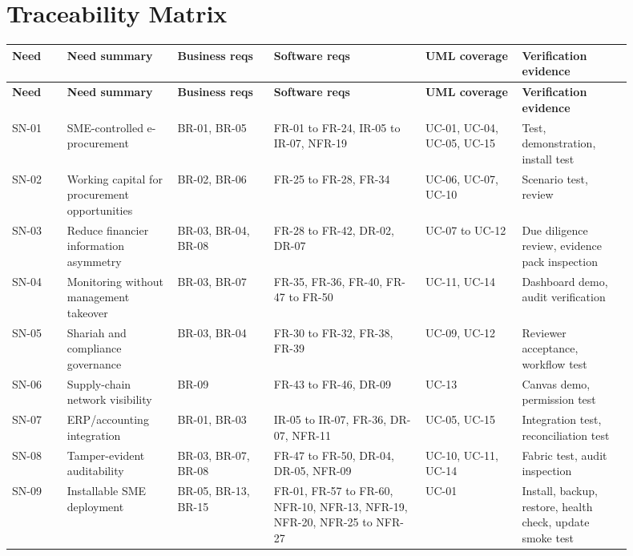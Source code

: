 \documentclass[11pt,a4paper]{article}
\begin{document}
\section{Traceability Matrix}
\begin{landscape}
\begin{footnotesize}
\begin{longtable}{@{}p{0.08\linewidth}p{0.16\linewidth}p{0.14\linewidth}p{0.22\linewidth}p{0.14\linewidth}p{0.16\linewidth}@{}}
\rowcolor{gray!18}\textbf{Need} & \textbf{Need summary} & \textbf{Business reqs} & \textbf{Software reqs} & \textbf{UML coverage} & \textbf{Verification evidence} \\ \hline
\endfirsthead
\rowcolor{gray!18}\textbf{Need} & \textbf{Need summary} & \textbf{Business reqs} & \textbf{Software reqs} & \textbf{UML coverage} & \textbf{Verification evidence} \\ \hline
\endhead
SN-01 & SME-controlled e-procurement & BR-01, BR-05 & FR-01 to FR-24, IR-05 to IR-07, NFR-19 & UC-01, UC-04, UC-05, UC-15 & Test, demonstration, install test \\ \hline
SN-02 & Working capital for procurement opportunities & BR-02, BR-06 & FR-25 to FR-28, FR-34 & UC-06, UC-07, UC-10 & Scenario test, review \\ \hline
SN-03 & Reduce financier information asymmetry & BR-03, BR-04, BR-08 & FR-28 to FR-42, DR-02, DR-07 & UC-07 to UC-12 & Due diligence review, evidence pack inspection \\ \hline
SN-04 & Monitoring without management takeover & BR-03, BR-07 & FR-35, FR-36, FR-40, FR-47 to FR-50 & UC-11, UC-14 & Dashboard demo, audit verification \\ \hline
SN-05 & Shariah and compliance governance & BR-03, BR-04 & FR-30 to FR-32, FR-38, FR-39 & UC-09, UC-12 & Reviewer acceptance, workflow test \\ \hline
SN-06 & Supply-chain network visibility & BR-09 & FR-43 to FR-46, DR-09 & UC-13 & Canvas demo, permission test \\ \hline
SN-07 & ERP/accounting integration & BR-01, BR-03 & IR-05 to IR-07, FR-36, DR-07, NFR-11 & UC-05, UC-15 & Integration test, reconciliation test \\ \hline
SN-08 & Tamper-evident auditability & BR-03, BR-07, BR-08 & FR-47 to FR-50, DR-04, DR-05, NFR-09 & UC-10, UC-11, UC-14 & Fabric test, audit inspection \\ \hline
SN-09 & Installable SME deployment & BR-05, BR-13, BR-15 & FR-01, FR-57 to FR-60, NFR-10, NFR-13, NFR-19, NFR-20, NFR-25 to NFR-27 & UC-01 & Install, backup, restore, health check, update smoke test \\ \hline

\end{longtable}
\end{footnotesize}
\end{landscape}
\end{document}
